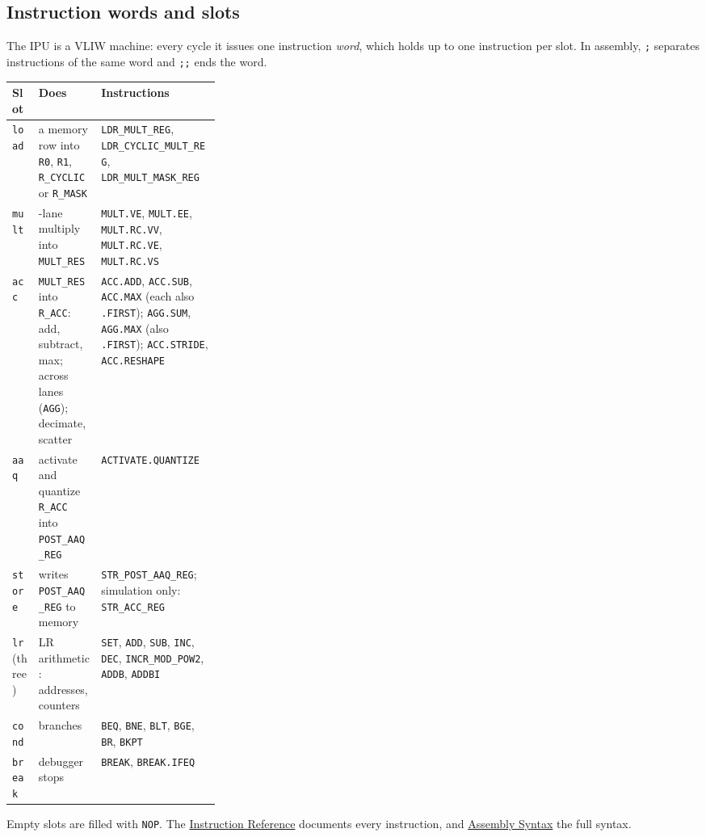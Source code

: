 \documentclass[11pt,a4paper]{article}
\newcommand{\doc}[2]{\href{https://rechefe.github.io/ipu-emulator/#1/}{\textcolor{accent}{#2}}}
\begin{document}
\subsection{Instruction words and slots}

The IPU is a VLIW machine: every cycle it issues one instruction \emph{word},
which holds up to one instruction per slot. In assembly, \texttt{;} separates
instructions of the same word and \texttt{;;} ends the word.

\begin{center}
\small
\begin{tabularx}{\linewidth}{l>{\raggedright\arraybackslash}p{0.3\linewidth}>{\raggedright\arraybackslash}X}
\toprule
Slot & Does & Instructions \\
\midrule
\texttt{load} & a memory row into \texttt{R0}, \texttt{R1}, \texttt{R\_CYCLIC} or \texttt{R\_MASK} & \texttt{LDR\_MULT\_REG}, \texttt{LDR\_CYCLIC\_MULT\_REG}, \texttt{LDR\_MULT\_MASK\_REG} \\
\texttt{mult} & 128-lane multiply into \texttt{MULT\_RES} & \texttt{MULT.VE}, \texttt{MULT.EE}, \texttt{MULT.RC.VV}, \texttt{MULT.RC.VE}, \texttt{MULT.RC.VS} \\
\texttt{acc} & \texttt{MULT\_RES} into \texttt{R\_ACC}: add, subtract, max; across lanes (\texttt{AGG}); decimate, scatter & \texttt{ACC.ADD}, \texttt{ACC.SUB}, \texttt{ACC.MAX} (each also \texttt{.FIRST}); \texttt{AGG.SUM}, \texttt{AGG.MAX} (also \texttt{.FIRST}); \texttt{ACC.STRIDE}, \texttt{ACC.RESHAPE} \\
\texttt{aaq} & activate and quantize \texttt{R\_ACC} into \texttt{POST\_AAQ\_REG} & \texttt{ACTIVATE.QUANTIZE} \\
\texttt{store} & writes \texttt{POST\_AAQ\_REG} to memory & \texttt{STR\_POST\_AAQ\_REG}; simulation only: \texttt{STR\_ACC\_REG} \\
\texttt{lr} (three) & LR arithmetic: addresses, counters & \texttt{SET}, \texttt{ADD}, \texttt{SUB}, \texttt{INC}, \texttt{DEC}, \texttt{INCR\_MOD\_POW2}, \texttt{ADDB}, \texttt{ADDBI} \\
\texttt{cond} & branches & \texttt{BEQ}, \texttt{BNE}, \texttt{BLT}, \texttt{BGE}, \texttt{BR}, \texttt{BKPT} \\
\texttt{break} & debugger stops & \texttt{BREAK}, \texttt{BREAK.IFEQ} \\
\bottomrule
\end{tabularx}
\end{center}

Empty slots are filled with \texttt{NOP}.
The \doc{instructions}{Instruction Reference} documents every instruction, and
\doc{assembly-syntax}{Assembly Syntax} the full syntax.
\end{document}
